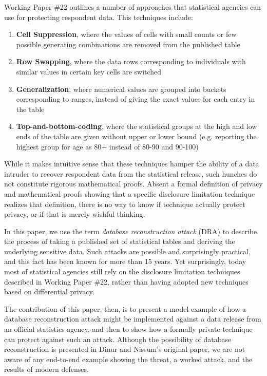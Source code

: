 \documentclass[runningheads]{llncs}
\begin{document}
Working Paper \#22 outlines a number of approaches that statistical
agencies can use for protecting respondent data. This techniques include:
\begin{enumerate}
  \item \textbf{Cell Suppression}, where the values of cells with small counts or few possible
        generating combinations are removed from the published table
  \item \textbf{Row Swapping}, where the data rows corresponding to individuals
        with similar values in certain key cells are switched
  \item \textbf{Generalization}, where numerical values are grouped into
        buckets corresponding to ranges, instead of giving the exact
        values for each entry in the table
  \item \textbf{Top-and-bottom-coding}, where the statistical groups at the high and low ends
        of the table are given without upper or lower bound (e.g.
        reporting the highest group for age as 80+ instead of
        80-90 and 90-100)
\end{enumerate}

While it makes intuitive sense that these techniques hamper the
ability of a  data intruder\cite{data-intruder} to recover respondent data from the
statistical release, such hunches do not constitute rigorous
mathematical proofs. Absent a formal definition of privacy and
mathematical proofs showing that a specific disclosure limitation
technique realizes that definition, there is no way to know if 
technique actually protect privacy, or if that is merely wishful thinking.

In this paper, we use
the term \emph{database reconstruction attack} (DRA) to describe the process of
taking a published set of statistical tables and deriving the
underlying sensitive data. Such attacks are possible and surprisingly
practical, and this fact has been known for more than 15
years\cite{noise}. Yet surprisingly, today most of
statistical agencies still rely on the disclosure
limitation techniques described in Working Paper \#22, rather than
having adopted new techniques based on differential
privacy\cite{Dwork:2006:CNS:2180286.2180305}. 

The contribution of this paper, then, is to present a model example of how
a database reconstruction attack might be implemented against a data
release from an official statistics agency, and then to show how a
formally private technique can protect against such an
attack. Although the possibility of database reconstruction is
presented in Dinur and Nissum's original paper\cite{noise}, we are not
aware of any end-to-end example showing the threat, a worked attack,
and the results of modern defenses. 
\end{document}

